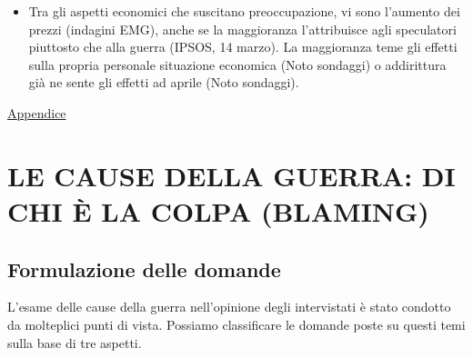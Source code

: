\documentclass[
]{book}
\providecommand{\tightlist}{%
  \setlength{\itemsep}{0pt}\setlength{\parskip}{0pt}}
\begin{document}
\begin{itemize}
\tightlist
\item
  Tra gli aspetti economici che suscitano preoccupazione, vi sono l'aumento dei prezzi (indagini EMG), anche se la maggioranza l'attribuisce agli speculatori piuttosto che alla guerra (IPSOS, 14 marzo). La maggioranza teme gli effetti sulla propria personale situazione economica (Noto sondaggi) o addirittura già ne sente gli effetti ad aprile (Noto sondaggi).
\end{itemize}

\href{https://github.com/LucianaFazio/Ucrania/blob/main/II\%20Preoccupazioni\%20Ucraina\%20v.5.pdf}{Appendice}

\hypertarget{le-cause-della-guerra-di-chi-uxe8-la-colpa-blaming}{%
\chapter{LE CAUSE DELLA GUERRA: DI CHI È LA COLPA (BLAMING)}\label{le-cause-della-guerra-di-chi-uxe8-la-colpa-blaming}}

\hypertarget{formulazione-delle-domande-1}{%
\section{Formulazione delle domande}\label{formulazione-delle-domande-1}}

L'esame delle cause della guerra nell'opinione degli intervistati è stato condotto da molteplici punti di vista. Possiamo classificare le domande poste su questi temi sulla base di tre aspetti.
\end{document}

